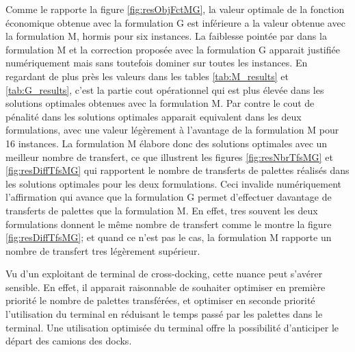 \documentclass[preprint,12pt,authoryear]{elsarticle}
\begin{document}

Comme le rapporte la figure \ref{fig:resObjFctMG}, la valeur optimale de la fonction économique obtenue avec la formulation G est inférieure a la valeur obtenue avec la formulation M, hormis pour six instances.
La faiblesse pointée par \citet{Gelareh2015} dans la formulation M et la correction proposée avec la formulation G apparait justifiée numériquement mais sans toutefois dominer sur toutes les instances.
En regardant de plus près les valeurs dans les tables \ref{tab:M_results} et \ref{tab:G_results}, c'est la partie cout opérationnel qui est plus élevée dans les solutions optimales obtenues avec la formulation M.
Par contre le cout de pénalité dans les solutions optimales apparait equivalent dans les deux formulations, avec une valeur légèrement à l'avantage de la formulation M pour 16 instances.
La formulation M élabore donc des solutions optimales avec un meilleur nombre de transfert, ce que illustrent les figures \ref{fig:resNbrTfsMG} et \ref{fig:resDiffTfsMG} qui rapportent le nombre de transferts de palettes réalisés dans les solutions optimales pour les deux formulations.
Ceci invalide numériquement l'affirmation qui avance que la formulation G  permet d'effectuer davantage de transferts de palettes que la formulation M. 
En effet, tres souvent les deux formulations donnent le même nombre de transfert comme le montre la figure \ref{fig:resDiffTfsMG}; et quand ce n'est pas le cas, la formulation M rapporte un nombre de transfert tres légèrement supérieur.

Vu d'un exploitant de terminal de cross-docking, cette nuance peut s'avérer sensible. 
En effet, il apparait raisonnable de souhaiter optimiser en première priorité le nombre de palettes transférées, et optimiser en seconde priorité l'utilisation du terminal en réduisant le temps passé par les palettes dans le terminal.
Une utilisation optimisée du terminal offre la possibilité d'anticiper le départ des camions des docks. 
\end{document}
